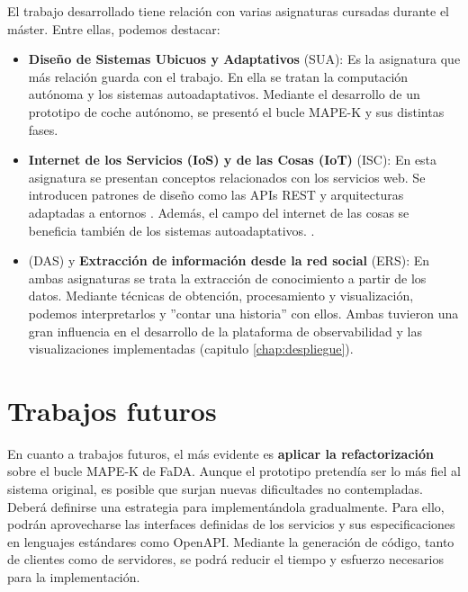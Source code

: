 El trabajo desarrollado tiene relación con varias asignaturas cursadas durante el máster. Entre ellas, podemos destacar:

\begin{itemize}
  \item \textbf{Diseño de Sistemas Ubicuos y Adaptativos} (SUA): Es la asignatura que más relación guarda con el trabajo. En ella se tratan la computación autónoma y los sistemas autoadaptativos. Mediante el desarrollo de un prototipo de coche autónomo, se presentó el bucle MAPE-K y sus distintas fases.

  \item \textbf{Internet de los Servicios (IoS) y de las Cosas (IoT)} (ISC): En esta asignatura se presentan conceptos relacionados con los servicios web. Se introducen patrones de diseño como las APIs REST y arquitecturas adaptadas a entornos . Además, el campo del internet de las cosas se beneficia también de los sistemas autoadaptativos. \cite{savaglioAgentbasedInternetThings2020}.

  \item \textbf{} (DAS) y \textbf{Extracción de información desde la red social} (ERS): En ambas asignaturas se trata la extracción de conocimiento a partir de los datos. Mediante técnicas de obtención, procesamiento y visualización, podemos interpretarlos y ''contar una historia'' con ellos. Ambas tuvieron una gran influencia en el desarrollo de la plataforma de observabilidad y las visualizaciones implementadas (capitulo \ref{chap:despliegue}).

\end{itemize}

\section{Trabajos futuros}

En cuanto a trabajos futuros, el más evidente es \textbf{aplicar la refactorización} sobre el bucle MAPE-K  de FaDA. Aunque el prototipo pretendía ser lo más fiel al sistema original, es posible que surjan nuevas dificultades no contempladas. Deberá definirse una estrategia para implementándola gradualmente. Para ello, podrán aprovecharse las interfaces definidas de los servicios y sus especificaciones en lenguajes estándares como OpenAPI. Mediante la generación de código, tanto de clientes como de servidores, se podrá reducir el tiempo y esfuerzo necesarios para la implementación.

